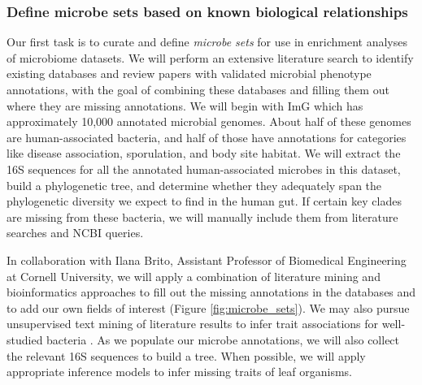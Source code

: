 \documentclass[12pt]{article}
\begin{document}
\subsubsection{Define microbe sets based on known biological relationships}\label{sec:set_curation}

Our first task is to curate and define \textit{microbe sets} for use in enrichment analyses of 
microbiome datasets. We will perform an extensive literature search
to identify existing databases and review papers with validated microbial phenotype annotations, with the goal of
combining these databases and filling them out where they are missing annotations.
We will begin with ImG which has approximately 10,000 annotated microbial genomes. 
About half of these genomes are human-associated bacteria, 
and half of those have annotations for categories like disease 
association, sporulation, and body site habitat. 
We will extract the 16S sequences for all the annotated human-associated 
microbes in this dataset, build a phylogenetic tree, and determine whether 
they adequately span the phylogenetic diversity we expect to 
find in the human gut. If certain key clades are missing from these 
bacteria, we will manually include them from literature searches and 
NCBI queries.

In collaboration with Ilana Brito, Assistant Professor of Biomedical Engineering at Cornell University, 
we will apply a combination of literature mining and bioinformatics approaches to fill 
out the missing annotations in the databases and to add our own fields 
of interest (Figure \ref{fig:microbe_sets}). We may also 
pursue unsupervised text mining of literature results to infer trait 
associations for well-studied bacteria \cite{korbel-lit_mining-2005}. As we populate 
our microbe annotations, we will also collect the relevant 16S sequences to 
build a tree. When possible, we will apply appropriate inference models to infer 
missing traits of leaf organisms.
\end{document}

